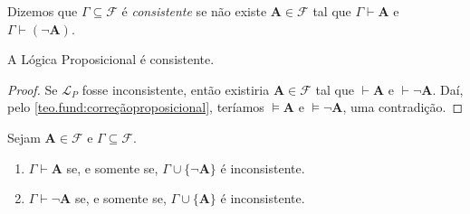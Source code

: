 \begin{definition}
    Dizemos que $\Gamma \subseteq \mathcal{F}$ é \emph{consistente} se não existe $\mathbf{A} \in \mathcal{F}$ tal que $\Gamma \vdash \mathbf{A}$ e $\Gamma \vdash (\neg \mathbf{A})$.
\end{definition}

\begin{theorem}
    A Lógica Proposicional é consistente.
\end{theorem}

\begin{proof}
    Se $\mathcal{L}_P$ fosse inconsistente, então existiria $\mathbf{A} \in \mathcal{F}$ tal que $\vdash \mathbf{A}$ e $\vdash \neg \mathbf{A}$. Daí, pelo \cref{teo.fund:correçãoproposicional}, teríamos $\vDash \mathbf{A}$ e $\vDash \neg \mathbf{A}$, uma contradição. \blackproof
\end{proof}

\begin{proposition} \label{prop.fund:gammaprovaAsse}
    Sejam $\mathbf{A} \in \mathcal{F}$ e $\Gamma \subseteq \mathcal{F}$.
        \begin{enumerate}[leftmargin=*, align=left, label=\textbf{(\alph*)}]
            \item $\Gamma \vdash \mathbf{A}$ se, e somente se, $\Gamma \cup \{\neg \mathbf{A}\}$ é inconsistente.
            \item $\Gamma \vdash \neg \mathbf{A}$ se, e somente se, $\Gamma \cup \{\mathbf{A}\}$ é inconsistente.
        \end{enumerate}
\end{proposition}

